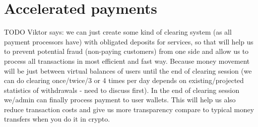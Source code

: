 \documentclass[11pt,fleqn,openany]{book}
\newcommand{\todo}[1]{{\color{red} TODO #1 }}
\begin{document}
\section{Accelerated payments}

\todo{Viktor says:
we can just create some kind of clearing system (as all payment processors have) with obligated deposits for services, so that will help us to prevent potential fraud (non-paying customers) from one side and allow us to process all transactions in most efficient and fast way. Because money movement will be just between virtual balances of users until the end of clearing session (we can do clearing once/twice/3 or 4 times per day depends on existing/projected statistics of withdrawals - need to discuss first). In the end of clearing session we/admin can finally process payment to user wallets. This will help us also reduce transaction costs and give us more transparency compare to typical money transfers when you do it in crypto.
}
\end{document}
